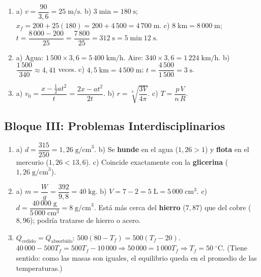 \documentclass[12pt, letterpaper]{article}
\begin{document}
  \begin{enumerate}[leftmargin=*, label=\textbf{\arabic*.}]
    \item a) $v = \dfrac{90}{3{,}6} = 25\;\text{m/s}$.
          \quad b) $3\;\text{min} = 180\;\text{s}$; $x_f = 200 + 25(180) = 200 + 4\,500 = 4\,700\;\text{m}$.
          \quad c) $8\;\text{km} = 8\,000\;\text{m}$; $t = \dfrac{8\,000 - 200}{25} = \dfrac{7\,800}{25} = 312\;\text{s} = 5\;\text{min}\;12\;\text{s}$.

    \item a) Agua: $1\,500 \times 3{,}6 = 5\,400\;\text{km/h}$. Aire: $340 \times 3{,}6 = 1\,224\;\text{km/h}$.
          \quad b) $\dfrac{1\,500}{340} \approx 4{,}41$ veces.
          \quad c) $4{,}5\;\text{km} = 4\,500\;\text{m}$; $t = \dfrac{4\,500}{1\,500} = 3\;\text{s}$.

    \item a) $v_0 = \dfrac{x - \frac{1}{2}at^2}{t} = \dfrac{2x - at^2}{2t}$.
          \quad b) $r = \sqrt[3]{\dfrac{3V}{4\pi}}$.
          \quad c) $T = \dfrac{p\,V}{n\,R}$.
  \end{enumerate}

  \newpage

  \subsection*{Bloque III: Problemas Interdisciplinarios}

  \begin{enumerate}[leftmargin=*, label=\textbf{\arabic*.}]
    \item a) $d = \dfrac{315}{250} = 1{,}26\;\text{g/cm}^3$.
          \quad b) Se \textbf{hunde} en el agua ($1{,}26 > 1$) y \textbf{flota} en el mercurio ($1{,}26 < 13{,}6$).
          \quad c) Coincide exactamente con la \textbf{glicerina} ($1{,}26\;\text{g/cm}^3$).

    \item a) $m = \dfrac{W}{g} = \dfrac{392}{9{,}8} = 40\;\text{kg}$.
          \quad b) $V = 7 - 2 = 5\;\text{L} = 5\,000\;\text{cm}^3$.
          \quad c) $d = \dfrac{40\,000\;\text{g}}{5\,000\;\text{cm}^3} = 8\;\text{g/cm}^3$. Está más cerca del \textbf{hierro} ($7{,}87$) que del cobre ($8{,}96$); podría tratarse de hierro o acero.

    \item $Q_{\text{cedido}} = Q_{\text{absorbido}}$: $500(80 - T_f) = 500(T_f - 20)$.
          $40\,000 - 500T_f = 500T_f - 10\,000 \Rightarrow 50\,000 = 1\,000T_f \Rightarrow T_f = 50\;^\circ\text{C}$.
          (Tiene sentido: como las masas son iguales, el equilibrio queda en el promedio de las temperaturas.)
  \end{enumerate}
\end{document}
